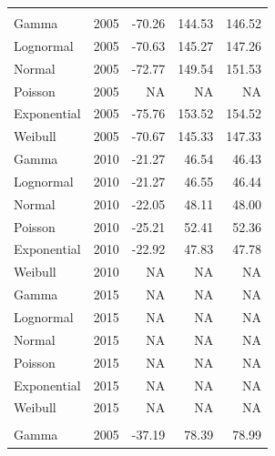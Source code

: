 \documentclass[
11pt, %
oneside, %
english, %
singlespacing, %
]{macthesis} %
\begin{document}
\begin{table}
\begin{tabular}{llrrr}
\addlinespace[0.3em]
\multicolumn{5}{l}{\textbf{Destination: Grocery store}}\\
\hspace{1em}Gamma & 2005 & -70.26 & 144.53 & 146.52\\
\hspace{1em}Lognormal & 2005 & -70.63 & 145.27 & 147.26\\
\hspace{1em}Normal & 2005 & -72.77 & 149.54 & 151.53\\
\hspace{1em}Poisson & 2005 & NA & NA & NA\\
\hspace{1em}Exponential & 2005 & -75.76 & 153.52 & 154.52\\
\hspace{1em}Weibull & 2005 & -70.67 & 145.33 & 147.33\\
\hspace{1em}Gamma & 2010 & -21.27 & 46.54 & 46.43\\
\hspace{1em}Lognormal & 2010 & -21.27 & 46.55 & 46.44\\
\hspace{1em}Normal & 2010 & -22.05 & 48.11 & 48.00\\
\hspace{1em}Poisson & 2010 & -25.21 & 52.41 & 52.36\\
\hspace{1em}Exponential & 2010 & -22.92 & 47.83 & 47.78\\
\hspace{1em}Weibull & 2010 & NA & NA & NA\\
\hspace{1em}Gamma & 2015 & NA & NA & NA\\
\hspace{1em}Lognormal & 2015 & NA & NA & NA\\
\hspace{1em}Normal & 2015 & NA & NA & NA\\
\hspace{1em}Poisson & 2015 & NA & NA & NA\\
\hspace{1em}Exponential & 2015 & NA & NA & NA\\
\hspace{1em}Weibull & 2015 & NA & NA & NA\\
\addlinespace[0.3em]
\multicolumn{5}{l}{\textbf{Destination: Restaurant}}\\
\hspace{1em}Gamma & 2005 & -37.19 & 78.39 & 78.99\\

\end{tabular}
\end{table}
\end{document}
